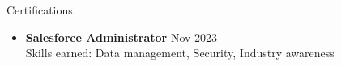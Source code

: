 \documentclass{resume} %
\begin{document}
\begin{rSection}{Certifications} 
        \begin{itemize}
            \item \textbf{Salesforce Administrator} \hfill Nov 2023\\
            Skills earned: Data management, Security, Industry awareness
        \end{itemize}
        
        
        \end{rSection}
        
\end{document}
